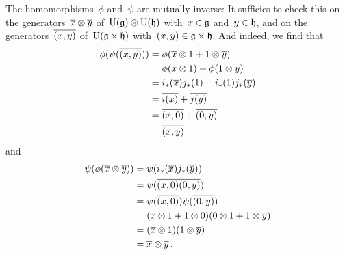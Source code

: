 \begin{example}
\begin{itemize}
      The homomorphisms~$\phi$ and~$\psi$ are mutually inverse:
      It sufficies to check this on the generators~$\overline{x} \otimes \overline{y}$ of~$\operatorname{U}(\mathfrak{g}) \otimes \operatorname{U}(\mathfrak{h})$ with~$x \in \mathfrak{g}$ and~$y \in \mathfrak{h}$, and on the generators~$\overline{(x,y)}$ of~$\operatorname{U}(\mathfrak{g} \times \mathfrak{h})$ with~$(x,y) \in \mathfrak{g} \times \mathfrak{h}$.
      And indeed, we find that
      \begin{align*}
        \phi( \psi( \overline{(x,y)} ) )
        &=
        \phi( \overline{x} \otimes 1 + 1 \otimes \overline{y} )
        \\
        &=
        \phi( \overline{x} \otimes 1 ) + \phi( 1 \otimes \overline{y} )
        \\
        &=
        i_*(\overline{x}) j_*(1) + i_*(1) j_*(\overline{y})
        \\
        &=
        \overline{i(x)} + \overline{j(y)}
        \\
        &=
        \overline{(x,0)} + \overline{(0,y)}
        \\
        &=
        \overline{(x,y)}
      \end{align*}
      and
      \begin{align*}
        \psi( \phi( \overline{x} \otimes \overline{y} ) )
        &=
        \psi( i_*(\overline{x}) j_*(\overline{y}) )
        \\
        &=
        \psi( \overline{(x,0)} \overline{(0,y)} )
        \\
        &=
        \psi( \overline{(x,0)} ) \psi( \overline{(0,y)} )
        \\
        &=
        ( \overline{x} \otimes 1 + 1 \otimes 0 ) ( 0 \otimes 1 + 1 \otimes \overline{y} )
        \\
        &=
        (\overline{x} \otimes 1) (1 \otimes \overline{y})
        \\
        &=
        \overline{x} \otimes \overline{y} \,.
      \end{align*}
  \end{itemize}
\end{example}


% 
% 
% 
% 
% 
% 
% 





